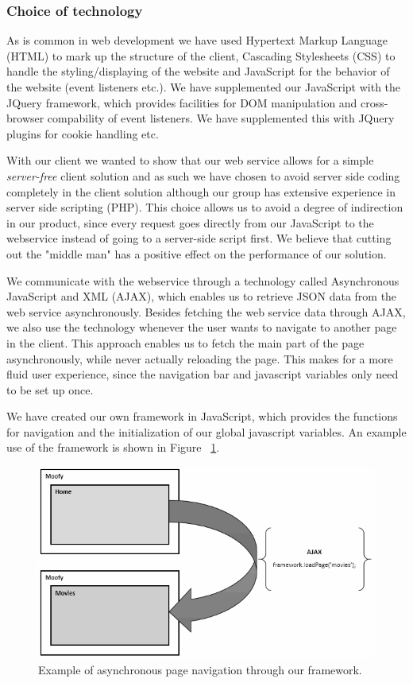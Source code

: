 \subsubsection{Choice of technology}

As is common in web development we have used Hypertext Markup Language (HTML) to mark up the structure of the client, Cascading Stylesheets (CSS) to handle the styling/displaying of the website and JavaScript for the behavior of the website (event listeners etc.). We have supplemented our JavaScript with the JQuery framework, which provides facilities for DOM manipulation and cross-browser compability of event listeners. We have supplemented this with JQuery plugins for cookie handling etc.

With our client we wanted to show that our web service allows for a simple \emph{server-free} client solution and as such we have chosen to avoid server side coding completely in the client solution although our group has extensive experience in server side scripting (PHP).
This choice allows us to avoid a degree of indirection in our product, since every request goes directly from our JavaScript to the webservice instead of going to a server-side script first. We believe that cutting out the "middle man" has a positive effect on the performance of our solution.

We communicate with the webservice through a technology called Asynchronous JavaScript and XML (AJAX), which enables us to retrieve JSON data from the web service asynchronously.
Besides fetching the web service data through AJAX, we also use the technology whenever the user wants to navigate to another page in the client. This approach enables us to fetch the main part of the page asynchronously, while never actually reloading the page. This makes for a more fluid user experience, since the navigation bar and javascript variables only need to be set up once.

We have created our own framework in JavaScript, which provides the functions for navigation and the initialization of our global javascript variables. An example use of the framework is shown in Figure ~\ref{fig:ajax}.

\begin{figure}[h]
	\centering
	\centerline{\includegraphics[scale=1]{./p1design/ajax.png}}
	\caption{Example of asynchronous page navigation through our framework.}
	\label{fig:ajax}
\end{figure}


